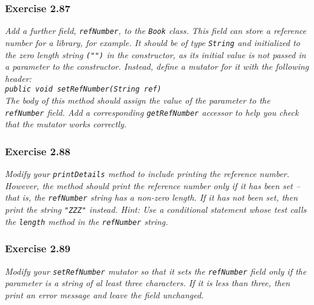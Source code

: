 \subsubsection*{Exercise 2.87}
\textit{Add a further field, \lstinline{refNumber}, to the \lstinline{Book} 
class. This field can store a reference number for a library, for example. It 
should be of type \lstinline{String} and initialized to the zero length string 
\lstinline{("")} in the constructor, as its initial value is not passed in a 
parameter to the constructor. Instead, define a mutator for it with the 
following header: \\
\lstinline{public void setRefNumber(String ref)}\\
The body of this method should assign the value of the parameter to the 
\lstinline{refNumber} field. Add a corresponding \lstinline{getRefNumber} 
accessor to help you check that the mutator works correctly. }\\

\subsubsection*{Exercise 2.88}
\textit{Modify your \lstinline{printDetails} method to include printing the 
reference number. However, the method should print the reference number only 
if it has been set -- that is, the \lstinline{refNumber} string has a non-zero 
length. If it has not been set, then print the string \lstinline{"ZZZ"} 
instead. Hint: Use a conditional statement whose test calls the 
\lstinline{length} method in the \lstinline{refNumber} string. }\\

\subsubsection*{Exercise 2.89}
\textit{Modify your \lstinline{setRefNumber} mutator so that it sets the \lstinline{refNumber} field only if the parameter is a string of al least three characters. If it is less than three, then print an error message and leave the field unchanged. }\\


